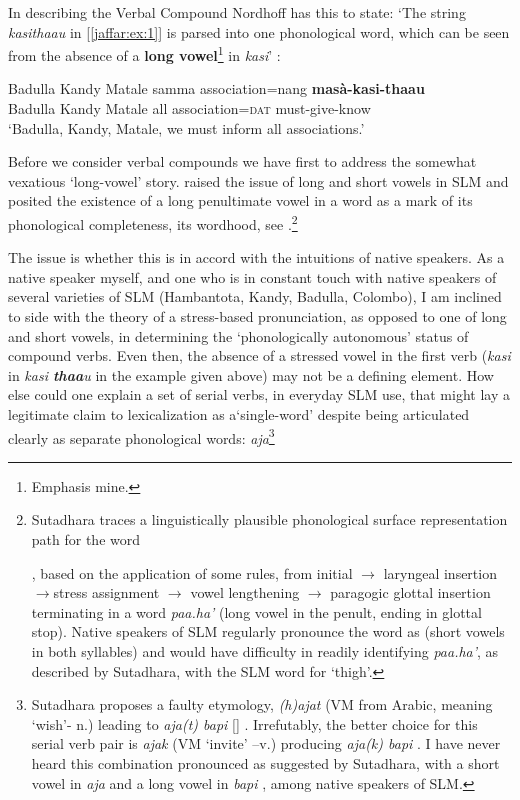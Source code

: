 In describing the Verbal Compound Nordhoff has this to state: `The string \textit{kasithaau} in [\ref{jaffar:ex:1}] is parsed into one phonological word, which can be seen from the absence of a \textbf{long vowel}\footnote{Emphasis
 mine.} in \textit{kasi}' \citep[171]{Nordhoff2009}:

\ea\label{jaffar:ex:1}
\gll 
Badulla Kandy Matale samma association={nang} \textbf{{masà-kasi-thaau}}\\
 Badulla Kandy Matale all association=\textsc{dat}  must-give-know\\
 `Badulla, Kandy, Matale, we must inform all associations.'
\z

Before we consider verbal compounds we have first to address the somewhat vexatious `long-vowel' story. \citet{Sutadhara1995} raised the issue of long and short vowels in SLM and posited the existence of a long penultimate vowel in a word as a mark of its phonological completeness, its wordhood, see \citet[18]{Sutadhara1995}.\footnote{


Sutadhara traces a linguistically plausible phonological surface representation path for the word 

, based on the application of some rules, from initial  $\rightarrow $ laryngeal insertion  $\rightarrow $stress assignment  $\rightarrow$ vowel lengthening  $\rightarrow$ paragogic glottal insertion  terminating in a word \textit{paa.ha'} (long vowel in the penult, ending in glottal stop).
Native speakers of SLM regularly pronounce the word as  (short vowels in both syllables) and would have difficulty in readily identifying \textit{paa.ha'}, as described by Sutadhara, with the SLM word for `thigh'.
}

The issue is whether this is in accord with the intuitions of native speakers. As a native speaker myself, and one who is in constant touch with native speakers of several varieties of SLM (Hambantota, Kandy, Badulla, Colombo), I am inclined to side with the theory of a stress-based pronunciation, as opposed to one of long and short vowels, in determining the `phonologically autonomous' status of compound verbs. Even then, the absence of a stressed vowel in the first verb (\textit{kasi} in \textit{kasi \textbf{thaa}u} in the example given above) may not be a defining element. How else could one explain a set of serial verbs, in everyday SLM use, that might lay a legitimate claim to lexicalization as a`single-word' despite being articulated clearly as separate phonological words: 
\textit{aja}\footnote{Sutadhara
 proposes a faulty etymology, \textit{(h)ajat}  (VM from Arabic, meaning `wish'- n.) leading to \textit{aja(t) bapi}  [] \citep[26]{Sutadhara1995}.
 Irrefutably, the better choice for this serial verb pair is \textit{ajak} (VM `invite' –v.) producing \textit{aja(k) bapi}   .  I have never heard this combination pronounced as suggested by Sutadhara, with a short vowel in \textit{aja} and a long vowel in \textit{bapi}  , among native speakers of SLM.    
} 


